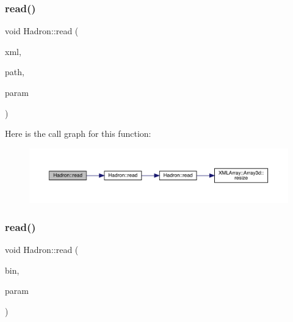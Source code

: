 \subsubsection{\texorpdfstring{read()}{read()}\hspace{0.1cm}{\footnotesize\ttfamily [12/94]}}
{\footnotesize\ttfamily void Hadron\+::read (\begin{DoxyParamCaption}\item[{\mbox{\hyperlink{classADATXML_1_1XMLReader}{X\+M\+L\+Reader}} \&}]{xml,  }\item[{const std\+::string \&}]{path,  }\item[{\mbox{\hyperlink{structHadron_1_1KeyHadronSUNNPartNPtCorr__t_1_1NPoint__t}{Key\+Hadron\+S\+U\+N\+N\+Part\+N\+Pt\+Corr\+\_\+t\+::\+N\+Point\+\_\+t}} \&}]{param }\end{DoxyParamCaption})}

Here is the call graph for this function\+:\nopagebreak
\begin{figure}[H]
\begin{center}
\leavevmode
\includegraphics[width=350pt]{d1/daf/namespaceHadron_aaef0a2bed7d8dd73e0611d46f68b4ee6_cgraph}
\end{center}
\end{figure}
\mbox{\label{namespaceHadron_ad89b4230ad913b777ca725473df40d15}} 
\subsubsection{\texorpdfstring{read()}{read()}\hspace{0.1cm}{\footnotesize\ttfamily [13/94]}}
{\footnotesize\ttfamily void Hadron\+::read (\begin{DoxyParamCaption}\item[{\mbox{\hyperlink{classADATIO_1_1BinaryReader}{Binary\+Reader}} \&}]{bin,  }\item[{\mbox{\hyperlink{structHadron_1_1KeyCGCSU3__t}{Key\+C\+G\+C\+S\+U3\+\_\+t}} \&}]{param }\end{DoxyParamCaption})}



